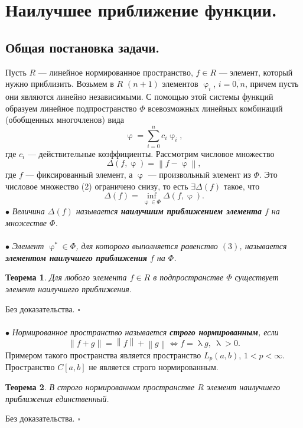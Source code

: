 \documentclass[a4paper, 12pt]{report}
\numberwithin{equation}{section}
\newenvironment{Proof} %
{\par\noindent{$\blacklozenge$}} %
{\hfill$\scriptstyle\square$}
\renewcommand{\varphi}{\upvarphi}
\renewcommand{\lambda}{\uplambda}
\newcommand\Norm[1]{\left\| #1 \right\|}
\newtheorem*{theorem}{Теорема}
\begin{document}
\section{Наилучшее приближение функции.}
\subsection{Общая постановка задачи.}
Пусть $R$ --- линейное нормированное пространство, $f\in R$ --- элемент, который нужно приблизить. Возьмем в $R$ $(n+1)$ элементов $\varphi_i$, $i=\overline{0,n}$, причем пусть они являются линейно независимыми. С помощью этой системы функций образуем линейное подпространство $\Phi$ всевозможных линейных комбинаций (обобщенных многочленов) вида \begin{equation}
	\varphi = \sum_{i=0}^n c_i\varphi_i,
\end{equation}
 где $c_i$ --- действительные коэффициенты. Рассмотрим числовое множество 
 \begin{equation}
 	\Delta (f,\varphi) = \Norm{f - \varphi},
 \end{equation} где $f$ --- фиксированный элемент, а $\varphi$ --- произвольный элемент из $\Phi$. Это числовое множество (2) ограничено снизу, то есть $\exists \Delta (f)$ такое, что
 \begin{equation}
 	\Delta (f) = \underset{\varphi \in \Phi}{\inf} \Delta (f,\varphi).
 \end{equation}
 $\bullet$ \textit{Величина $\Delta (f)$ называется \textbf{наилучшим приближением элемента} $f$ на множестве $\Phi$.} \\\\
 $\bullet$ \textit{Элемент $\varphi^*\in \Phi$, для которого выполняется равенство $(3)$, называется \textbf{элементом наилучшего приближения} $f$ на $\Phi$.}
 \begin{theorem}
 	Для любого элемента $f \in R$ в подпространстве $\Phi$ существует элемент наилучшего приближения.
 \end{theorem}
 \begin{Proof}
 	Без доказательства.
 \end{Proof}\\\\
 $\bullet$ \textit{Нормированное пространство называется \textbf{строго нормированным}, если} $$\Norm{f+g} = \Norm{f} + \Norm{g} \Longleftrightarrow f = \lambda g,\ \lambda > 0.$$
 Примером такого пространства является пространство $L_p(a,b)$, $1 < p < \infty$. Пространство $C[a,b]$ не является строго нормированным.
 \begin{theorem}
 	В строго нормированном пространстве $R$ элемент наилучшего приближения единственный.
 \end{theorem}
 \begin{Proof}
 	Без доказательства.
 \end{Proof}
\end{document}
